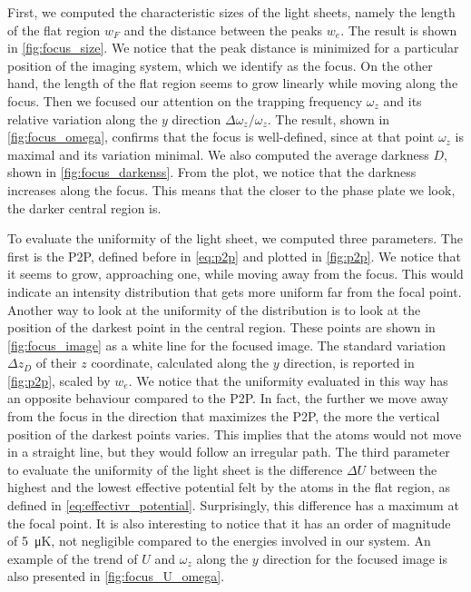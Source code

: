 First, we computed the characteristic sizes of the light sheets, namely the length of the flat region $w_F$ and the distance between the peaks $w_e$. The result is shown in \cref{fig:focus_size}. We notice that the peak distance is minimized for a particular position of the imaging system, which we identify as the focus. On the other hand, the length of the flat region seems to grow linearly while moving along the focus. Then we focused our attention on the trapping frequency $\omega_z$ and its relative variation along the $y$ direction $\Delta \omega_z/\omega_z$. The result, shown in \cref{fig:focus_omega}, confirms that the focus is well-defined, since at that point $\omega_z$ is maximal and its variation minimal. We also computed the average darkness $D$, shown in \cref{fig:focus_darkenss}. From the plot, we notice that the darkness increases along the focus. This means that the closer to the phase plate we look, the darker central region is.

To evaluate the uniformity of the light sheet, we computed three parameters. The first is the P2P, defined before in \cref{eq:p2p} and plotted in \cref{fig:p2p}. We notice that it seems to grow, approaching one, while moving away from the focus. This would indicate an intensity distribution that gets more uniform far from the focal point. Another way to look at the uniformity of the distribution is to look at the position of the darkest point in the central region. These points are shown in \cref{fig:focus_image} as a white line for the focused image. The standard variation $\Delta z_D$ of their $z$ coordinate, calculated along the $y$ direction, is reported in \cref{fig:p2p}, scaled by $w_e$. We notice that the uniformity evaluated in this way has an opposite behaviour compared to the P2P. In fact, the further we move away from the focus in the direction that maximizes the P2P, the more the vertical position of the darkest points varies. This implies that the atoms would not move in a straight line, but they would follow an irregular path. The third parameter to evaluate the uniformity of the light sheet is the difference $\Delta U$ between the highest and the lowest effective potential felt by the atoms in the flat region, as defined in \cref{eq:effectivr_potential}. Surprisingly, this difference has a maximum at the focal point. It is also interesting to notice that it has an order of magnitude of \SI{5}{\micro K}, not negligible compared to the energies involved in our system. An example of the trend of $U$ and $\omega_z$ along the $y$ direction for the focused image is also presented in \cref{fig:focus_U_omega}.


